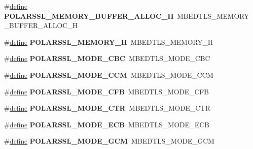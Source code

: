 \begin{DoxyCompactItemize}
\#\hyperlink{structdefine}{define} {\bfseries P\+O\+L\+A\+R\+S\+S\+L\+\_\+\+M\+E\+M\+O\+R\+Y\+\_\+\+B\+U\+F\+F\+E\+R\+\_\+\+A\+L\+L\+O\+C\+\_\+H}~M\+B\+E\+D\+T\+L\+S\+\_\+\+M\+E\+M\+O\+R\+Y\+\_\+\+B\+U\+F\+F\+E\+R\+\_\+\+A\+L\+L\+O\+C\+\_\+H
\item 
\mbox{\label{compat-1_83_8h_a8fa790063392fc10e7e08efdcad5c804}} 
\#\hyperlink{structdefine}{define} {\bfseries P\+O\+L\+A\+R\+S\+S\+L\+\_\+\+M\+E\+M\+O\+R\+Y\+\_\+H}~M\+B\+E\+D\+T\+L\+S\+\_\+\+M\+E\+M\+O\+R\+Y\+\_\+H
\item 
\mbox{\label{compat-1_83_8h_a91b6b331824528d9e48d508a52e6de50}} 
\#\hyperlink{structdefine}{define} {\bfseries P\+O\+L\+A\+R\+S\+S\+L\+\_\+\+M\+O\+D\+E\+\_\+\+C\+BC}~M\+B\+E\+D\+T\+L\+S\+\_\+\+M\+O\+D\+E\+\_\+\+C\+BC
\item 
\mbox{\label{compat-1_83_8h_a90d1a39a3137a07b186d929a84fd9ab2}} 
\#\hyperlink{structdefine}{define} {\bfseries P\+O\+L\+A\+R\+S\+S\+L\+\_\+\+M\+O\+D\+E\+\_\+\+C\+CM}~M\+B\+E\+D\+T\+L\+S\+\_\+\+M\+O\+D\+E\+\_\+\+C\+CM
\item 
\mbox{\label{compat-1_83_8h_ad95b132ace26144bed97941d91db3ddc}} 
\#\hyperlink{structdefine}{define} {\bfseries P\+O\+L\+A\+R\+S\+S\+L\+\_\+\+M\+O\+D\+E\+\_\+\+C\+FB}~M\+B\+E\+D\+T\+L\+S\+\_\+\+M\+O\+D\+E\+\_\+\+C\+FB
\item 
\mbox{\label{compat-1_83_8h_a78e1ebbfdecfa9fcb0005e5914c0f263}} 
\#\hyperlink{structdefine}{define} {\bfseries P\+O\+L\+A\+R\+S\+S\+L\+\_\+\+M\+O\+D\+E\+\_\+\+C\+TR}~M\+B\+E\+D\+T\+L\+S\+\_\+\+M\+O\+D\+E\+\_\+\+C\+TR
\item 
\mbox{\label{compat-1_83_8h_ac554b3838d8396da8656867e3616d036}} 
\#\hyperlink{structdefine}{define} {\bfseries P\+O\+L\+A\+R\+S\+S\+L\+\_\+\+M\+O\+D\+E\+\_\+\+E\+CB}~M\+B\+E\+D\+T\+L\+S\+\_\+\+M\+O\+D\+E\+\_\+\+E\+CB
\item 
\mbox{\label{compat-1_83_8h_aaf7dfe24812792e42baebfc31fa71e90}} 
\#\hyperlink{structdefine}{define} {\bfseries P\+O\+L\+A\+R\+S\+S\+L\+\_\+\+M\+O\+D\+E\+\_\+\+G\+CM}~M\+B\+E\+D\+T\+L\+S\+\_\+\+M\+O\+D\+E\+\_\+\+G\+CM
\item 
\mbox{\label{compat-1_83_8h_add447952bd6783ae2cf3423971e5643b}} 

\end{DoxyCompactItemize}
